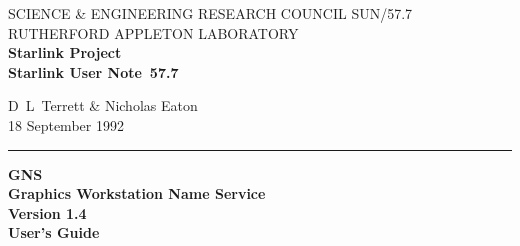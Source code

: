 \pagestyle{myheadings}

\newcommand{\stardoccategory}  {Starlink User Note}
\newcommand{\stardocinitials}  {SUN}
\newcommand{\stardocnumber}    {57.7}
\newcommand{\stardocauthors}   {D~L~Terrett \& Nicholas Eaton}
\newcommand{\stardocdate}      {18 September 1992}
\newcommand{\stardoctitle}     {GNS\\[2.5ex] Graphics Workstation Name Service}
\newcommand{\stardocversion}   {Version 1.4}
\newcommand{\stardocmanual}    {User's Guide}

\newcommand{\stardocname}{\stardocinitials /\stardocnumber}
\markright{\stardocname}
\setlength{\textwidth}{160mm}
\setlength{\textheight}{230mm}
\setlength{\topmargin}{-2mm}
\setlength{\oddsidemargin}{0mm}
\setlength{\evensidemargin}{0mm}
\setlength{\parindent}{0mm}
\setlength{\parskip}{\medskipamount}
\setlength{\unitlength}{1mm}

\renewcommand{\_}{{\tt\char'137}}
\newcommand{\routinehead}[1]{\vspace{\bigskipamount}{\large\bf#1}}
\newenvironment{routinelist}{\begin{list}{}{\setlength{\leftmargin}{2cm}
                             \setlength{\parsep}{\smallskipamount}}}{\end{list}}
\newcommand{\routine}[1]{\item\hspace{-1cm}#1\\}

\newenvironment{spec}[2]%
{\goodbreak\rule{\textwidth}{0.3mm}
{\Large {\bf#1} \hfill #2 \hfill {\bf#1}}
\begin{description}}{\end{description}}
\newenvironment{params}%
{\[\begin{tabular}{p{0.07\textwidth}p{0.20\textwidth}p{0.59\textwidth}}}%
{\end{tabular}\]}


\thispagestyle{empty}
SCIENCE \& ENGINEERING RESEARCH COUNCIL \hfill \stardocname\\
RUTHERFORD APPLETON LABORATORY\\
{\large\bf Starlink Project\\}
{\large\bf \stardoccategory\ \stardocnumber}
\begin{flushright}
\stardocauthors\\
\stardocdate
\end{flushright}
\vspace{-4mm}
\rule{\textwidth}{0.5mm}
\vspace{5mm}
\begin{center}
{\Huge\bf  \stardoctitle \\ [2.5ex]}
{\LARGE\bf \stardocversion \\ [4.0ex]}
{\Huge\bf  \stardocmanual}
\end{center}
\vspace{5mm}

